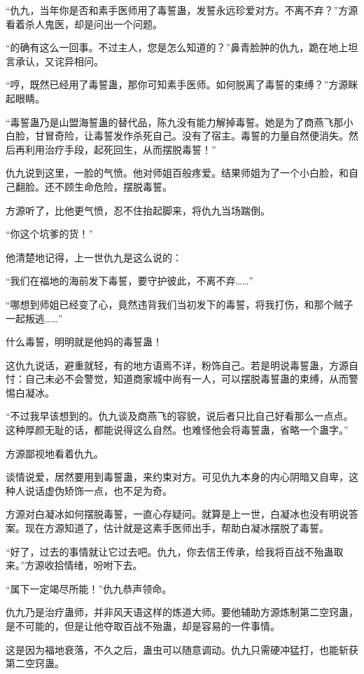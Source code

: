 \begin{this_body}
“仇九，当年你是否和素手医师用了毒誓蛊，发誓永远珍爱对方。不离不弃？”方源看着杀人鬼医，却是问出一个问题。

“的确有这么一回事。不过主人，您是怎么知道的？”鼻青脸肿的仇九，跪在地上坦言承认，又诧异相问。

“哼，既然已经用了毒誓蛊，那你可知素手医师。如何脱离了毒誓的束缚？”方源眯起眼睛。

“毒誓蛊乃是山盟海誓蛊的替代品，陈九没有能力解掉毒誓。她是为了商燕飞那小白脸，甘冒奇险，让毒誓发作杀死自己。没有了宿主。毒誓的力量自然便消失。然后再利用治疗手段，起死回生，从而摆脱毒誓！”

仇九说到这里，一脸的气愤。他对师姐百般疼爱。结果师姐为了一个小白脸，和自己翻脸。还不顾生命危险，摆脱毒誓。

方源听了，比他更气愤，忍不住抬起脚来，将仇九当场踹倒。

“你这个坑爹的货！”

他清楚地记得，上一世仇九是这么说的：

“我们在福地的海前发下毒誓，要守护彼此，不离不弃……”

“哪想到师姐已经变了心，竟然违背我们当初发下的毒誓，将我打伤，和那个贼子一起叛逃……”

什么毒誓，明明就是他妈的毒誓蛊！

这仇九说话，避重就轻，有的地方语焉不详，粉饰自己。若是明说毒誓蛊，方源自忖：自己未必不会警觉，知道商家城中尚有一人，可以摆脱毒誓蛊的束缚，从而警惕白凝冰。

“不过我早该想到的。仇九谈及商燕飞的容貌，说后者只比自己好看那么一点点。这种厚颜无耻的话，都能说得这么自然。也难怪他会将毒誓蛊，省略一个蛊字。”

方源鄙视地看着仇九。

谈情说爱，居然要用到毒誓蛊，来约束对方。可见仇九本身的内心阴暗又自卑，这种人说话虚伪矫饰一点，也不足为奇。

方源对白凝冰如何摆脱毒誓，一直心存疑问。就算是上一世，白凝冰也没有明说答案。现在方源知道了，估计就是这素手医师出手，帮助白凝冰摆脱了毒誓。

“好了，过去的事情就让它过去吧。仇九，你去信王传承，给我将百战不殆蛊取来。”方源收拾情绪，吩咐下去。

“属下一定竭尽所能！”仇九恭声领命。

仇九乃是治疗蛊师，并非风天语这样的炼道大师。要他辅助方源炼制第二空窍蛊，是不可能的，但是让他夺取百战不殆蛊，却是容易的一件事情。

这是因为福地衰落，不久之后，蛊虫可以随意调动。仇九只需硬冲猛打，也能斩获第二空窍蛊。


\end{this_body}
